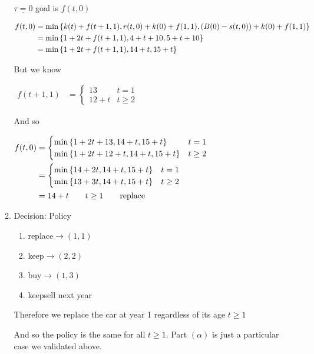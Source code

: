 \begin{prob}
\begin{enumerate}[label = {\textbf{(\greek*)}}]
\begin{sol}
\begin{enumerate}
$\underline{\tau=0}$ goal is $f(t,0)$

$\begin{aligned}
f(t,0) &= \min\left\{k(t)+f(t+1,1),r(t,0)+k(0)+f(1,1),\left(B(0)-s(t,0)\right)+k(0)+f(1,1)\right\}\\
&= \min\left\{1+2t+f(t+1,1),4+t+10,5+t+10\right\}\\
&= \min\left\{1+2t+f(t+1,1),14+t,15+t\right\}
\end{aligned}$

But we know

$\begin{aligned}
f(t+1,1) 
 &=\begin{cases}
 13 & t=1 \\
 12+t & t\geq2 
 \end{cases}
\end{aligned}$

And so 

$\begin{aligned}
f(t,0) &=\begin{cases}
\min\left\{1+2t+13,14+t,15+t\right\} & t=1\\
\min\left\{1+2t+12+t,14+t,15+t\right\} & t\geq2
\end{cases}\\
&=\begin{cases}
\min\left\{14+2t,14+t,15+t\right\} & t=1\\
\min\left\{13+3t,14+t,15+t\right\} & t\geq2
\end{cases}\\
&=14+t \qquad t\geq1 \qquad \text{replace}
\end{aligned}$

\item Decision: Policy
\begin{enumerate}[start = 0, label = {$\tau=\arabic*:$}]
    \item replace\quad $\to (1,1)$
    \item keep\quad $\to (2,2)$
    \item buy\quad $\to (1,3)$
    \item keep\quad sell next year
\end{enumerate}

Therefore we replace the car at year 1 regardless of its age $t\geq1$

And so the policy is the same for all $t\geq1$. Part $(\alpha)$ is just a particular case we validated above.
\end{enumerate}
    \end{sol}
\end{enumerate}

\end{prob}